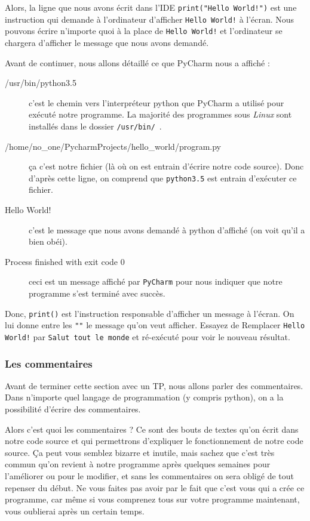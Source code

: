 \documentclass[12pt]{article}
\newcommand{\code}[1]{\colorbox{light-gray}{\texttt{#1}}}
\begin{document}
        Alors, la ligne que nous avons écrit dans l'IDE \code{print("Hello World!")} est une instruction qui demande
        à l'ordinateur d'afficher \code{Hello World!} à l'écran. Nous pouvons écrire n'importe quoi à la place de
        \code{Hello World!} et l'ordinateur se chargera d'afficher le message que nous avons demandé.

        Avant de continuer, nous allons détaillé ce que PyCharm nous a affiché :
        \begin{description}
            \item[/usr/bin/python3.5] c'est le chemin vers l'interpréteur python que PyCharm a utilisé pour
                exécuté notre programme. La majorité des programmes sous \emph{Linux} sont installés dans le dossier
                \code{/usr/bin/}\ .
            \item[/home/no\_one/PycharmProjects/hello\_world/program.py] ça c'est notre fichier (là où on est entrain
                d'écrire notre code source). Donc d'après cette ligne, on comprend que \code{python3.5} est entrain
                d'exécuter ce fichier.
            \item[Hello World!] c'est le message que nous avons demandé à python d'affiché (on voit qu'il a bien
                obéi).
            \item[Process finished with exit code 0] ceci est un message affiché par \code{PyCharm} pour nous indiquer
                que notre programme s'est terminé avec succès.
        \end{description}

        Donc, \code{print()} est l'instruction responsable d'afficher un message à l'écran. On lui donne entre
        les \code{""} le message qu'on veut afficher.
        Essayez de Remplacer \code{Hello World!} par \code{Salut tout le monde} et ré-exécuté pour voir le nouveau résultat.

        \subsubsection{Les commentaires}
            Avant de terminer cette section avec un TP, nous allons parler des commentaires.
            Dans n'importe quel langage de programmation (y compris python), on a la possibilité d'écrire des commentaires.

            Alors c'est quoi les commentaires ? Ce sont des bouts de textes qu'on écrit dans notre code source et qui
            permettrons d'expliquer le fonctionnement de notre code source. Ça peut vous semblez bizarre et inutile, mais
            sachez que c'est très commun qu'on revient à notre programme après quelques semaines pour l'améliorer
            ou pour le modifier, et sans les commentaires on sera obligé de tout repenser du début. Ne vous faites pas
            avoir par le fait que c'est vous qui a crée ce programme, car même si vous comprenez tous sur votre
            programme maintenant, vous oublierai après un certain temps.
\end{document}
